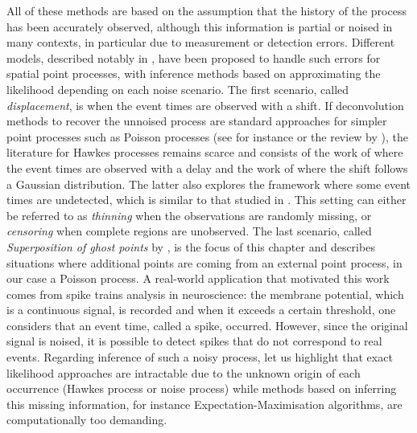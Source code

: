         All of these methods are based on the assumption that the history of the process has been accurately observed, although this information is partial or noised in many contexts, in particular due to measurement or detection errors.
        Different models, described notably in \textcite{Lund2000}, have been proposed to handle such errors for spatial point processes, with inference methods based on approximating the likelihood depending on each noise scenario.
            The first scenario, called \textit{displacement}, is when the event times are observed with a shift. If deconvolution methods to recover the unnoised process are standard approaches for simpler point processes such as Poisson processes (see for instance \textcite{Antoniadis2006,Bonnet2022} or the review by \textcite{Hohage2016}), the literature for Hawkes processes remains scarce and consists of the work of \textcite{Trouleau2019} where the event times are observed with a delay and the work of \textcite{Deutsch2020} where the shift follows a Gaussian distribution. The latter also explores the framework where some event times are undetected, which is similar to that studied in \textcite{Mei2019}. This setting can either be referred to as \textit{thinning} when the observations are randomly missing, or \textit{censoring} when complete regions are unobserved. The last scenario, called \textit{Superposition of ghost points} by \textcite{Lund2000}, is the focus of this chapter and describes situations where additional points are coming from an external point process, in our case a Poisson process.   A real-world application that motivated this work comes from spike trains analysis in neuroscience: the membrane potential, which is a continuous signal, is recorded and when it exceeds a certain threshold, one considers that an event time, called a spike, occurred. However, since the original signal is noised, it is possible to detect spikes that do not correspond to real events.
          Regarding inference of such a noisy process, let us highlight that exact likelihood approaches are intractable due to the unknown origin of each occurrence (Hawkes process or noise process) while methods based on inferring this missing information, for instance Expectation-Maximisation algorithms, are computationally too demanding.
               
